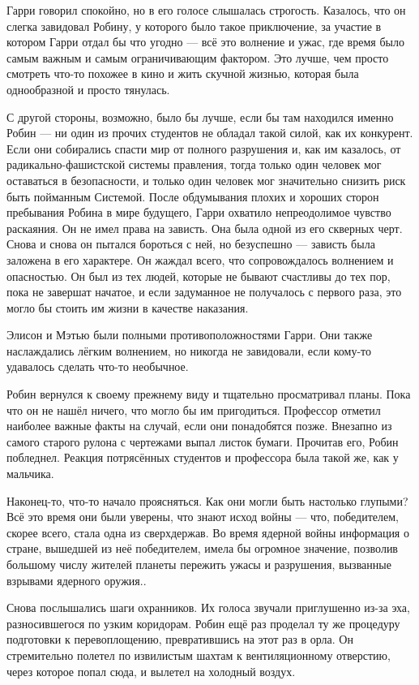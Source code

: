 \documentclass[a5paper, 9pt,
final, openany, twoside=true]{memoir}
\begin{document}
Гарри говорил спокойно, но в его голосе слышалась строгость. Казалось, что он слегка завидовал Робину, у которого было такое приключение, за участие в котором Гарри отдал бы что угодно — всё это волнение и ужас, где время было самым важным и самым ограничивающим фактором. Это лучше, чем просто смотреть что-то похожее в кино и жить скучной жизнью, которая была однообразной и просто тянулась.

С другой стороны, возможно, было бы лучше, если бы там находился именно Робин — ни один из прочих студентов не обладал такой силой, как их конкурент. Если они собирались спасти мир от полного разрушения и, как им казалось, от радикально-фашистской системы правления, тогда только один человек мог оставаться в безопасности, и только один человек мог значительно снизить риск быть пойманным Системой. После обдумывания плохих и хороших сторон пребывания Робина в мире будущего, Гарри охватило непреодолимое чувство раскаяния. Он не имел права на зависть. Она была одной из его скверных черт. Снова и снова он пытался бороться с ней, но безуспешно — зависть была заложена в его характере. Он жаждал всего, что сопровождалось волнением и опасностью. Он был из тех людей, которые не бывают счастливы до тех пор, пока не завершат начатое, и если задуманное не получалось с первого раза, это могло бы стоить им жизни в качестве наказания.

Элисон и Мэтью были полными противоположностями Гарри. Они также наслаждались лёгким волнением, но никогда не завидовали, если кому-то удавалось сделать что-то необычное.

Робин вернулся к своему прежнему виду и тщательно просматривал планы. Пока что он не нашёл ничего, что могло бы им пригодиться. Профессор отметил наиболее важные факты на случай, если они понадобятся позже. Внезапно из самого старого рулона с чертежами выпал листок бумаги. Прочитав его, Робин побледнел. Реакция потрясённых студентов и профессора была такой же, как у мальчика.

Наконец-то, что-то начало проясняться. Как они могли быть настолько глупыми? Всё это время они были уверены, что знают исход войны — что, победителем, скорее всего, стала одна из сверхдержав. Во время ядерной войны информация о стране, вышедшей из неё победителем,  имела бы огромное значение, позволив большому числу жителей планеты пережить ужасы и разрушения, вызванные взрывами ядерного оружия..\bigskip

Снова послышались шаги охранников. Их голоса звучали приглушенно из-за эха, разносившегося по узким коридорам. Робин ещё раз проделал ту же процедуру подготовки к перевоплощению, превратившись на этот раз в орла. Он стремительно полетел по извилистым шахтам к вентиляционному отверстию, через которое попал сюда, и вылетел на холодный воздух.\bigskip
\end{document}
